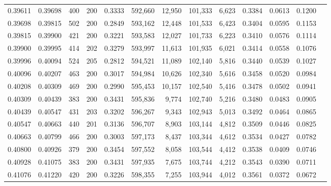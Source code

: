 \begin{tabular}{rrrrrrrrrrrrr}
0.39611 & 0.39698 &   400 & 200 &                                     0.3333 & 592,660 &  12,950 & 101,333 &   6,623 & 0.3384 & 0.0613 & 0.1200 \\
0.39698 & 0.39815 &   502 & 200 &                                     0.2849 & 593,162 &  12,448 & 101,533 &   6,423 & 0.3404 & 0.0595 & 0.1153 \\
0.39815 & 0.39900 &   421 & 200 &                                     0.3221 & 593,583 &  12,027 & 101,733 &   6,223 & 0.3410 & 0.0576 & 0.1114 \\
0.39900 & 0.39995 &   414 & 202 &                                     0.3279 & 593,997 &  11,613 & 101,935 &   6,021 & 0.3414 & 0.0558 & 0.1076 \\
0.39996 & 0.40094 &   524 & 205 &                                     0.2812 & 594,521 &  11,089 & 102,140 &   5,816 & 0.3440 & 0.0539 & 0.1027 \\
0.40096 & 0.40207 &   463 & 200 &                                     0.3017 & 594,984 &  10,626 & 102,340 &   5,616 & 0.3458 & 0.0520 & 0.0984 \\
0.40208 & 0.40309 &   469 & 200 &                                     0.2990 & 595,453 &  10,157 & 102,540 &   5,416 & 0.3478 & 0.0502 & 0.0941 \\
0.40309 & 0.40439 &   383 & 200 &                                     0.3431 & 595,836 &   9,774 & 102,740 &   5,216 & 0.3480 & 0.0483 & 0.0905 \\
0.40439 & 0.40547 &   431 & 203 &                                     0.3202 & 596,267 &   9,343 & 102,943 &   5,013 & 0.3492 & 0.0464 & 0.0865 \\
0.40547 & 0.40663 &   440 & 201 &                                     0.3136 & 596,707 &   8,903 & 103,144 &   4,812 & 0.3509 & 0.0446 & 0.0825 \\
0.40663 & 0.40799 &   466 & 200 &                                     0.3003 & 597,173 &   8,437 & 103,344 &   4,612 & 0.3534 & 0.0427 & 0.0782 \\
0.40800 & 0.40926 &   379 & 200 &                                     0.3454 & 597,552 &   8,058 & 103,544 &   4,412 & 0.3538 & 0.0409 & 0.0746 \\
0.40928 & 0.41075 &   383 & 200 &                                     0.3431 & 597,935 &   7,675 & 103,744 &   4,212 & 0.3543 & 0.0390 & 0.0711 \\
0.41076 & 0.41220 &   420 & 200 &                                     0.3226 & 598,355 &   7,255 & 103,944 &   4,012 & 0.3561 & 0.0372 & 0.0672 \\

\end{tabular}

